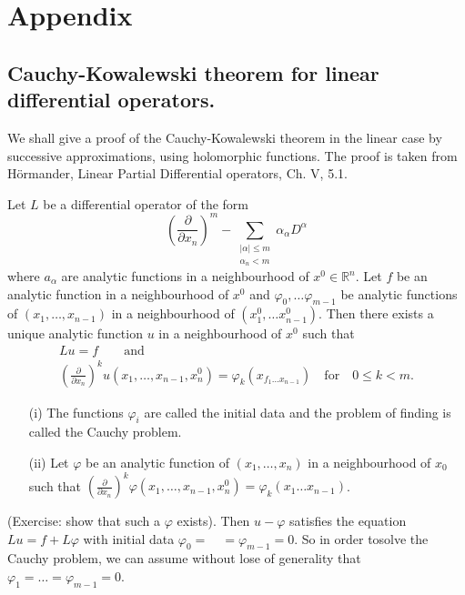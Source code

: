 \appendix
\chapter*{Appendix}


\setcounter{pageoriginal}{0}
\section*{Cauchy-Kowalewski theorem for linear differential operators.}\pageoriginale

We shall give a proof of the Cauchy-Kowalewski theorem in the linear case by successive approximations, using holomorphic functions. The proof is taken from H\"ormander, Linear Partial Differential operators, Ch. V, 5.1.

\setcounter{theorem}{0}
\begin{theorem}\label{appendix-thm1}
Let $L$ be a differential operator of the form
$$
\left(\frac{\partial}{\partial x_{n}}\right)^{m}-\sum\limits_{\substack{|\alpha|\leq m\\ \alpha_{n}<m}}\alpha_{\alpha}D^{\alpha}
$$
where $a_{\alpha}$ are analytic functions in a neighbourhood of $x^{0}\in \mathbb{R}^{n}$. Let $f$ be an analytic function in a neighbourhood of $x^{0}$ and $\varphi_{0},\ldots\varphi_{m-1}$ be analytic functions of $(x_{1},\ldots,x_{n-1})$ in a neighbourhood of $(x^{0}_{1},\ldots x^{0}_{n-1})$. Then there exists a unique analytic function $u$ in a neighbourhood of $x^{0}$ such that
\begin{gather*}
Lu=f\qquad\text{and}\\[4pt]
\left(\frac{\partial}{\partial x_{n}}\right)^{k}u\left(x_{1},\ldots,x_{n-1},x^{0}_{n}\right)=\varphi_{k}(x_{f_{1}\ldots x_{n-1}})\quad\text{for}\quad 0\leq k<m.
\end{gather*}
\end{theorem}

\begin{remark*}
\begin{itemize}
\item[\rm(i)] The functions $\varphi_{i}$ are called the initial data and the problem of finding is called the Cauchy problem.

\item[\rm(ii)] Let $\varphi$ be an analytic function of $(x_{1},\ldots,x_{n})$ in a neighbourhood of $x_{0}$ such that $\left(\frac{\partial}{\partial x_{n}}\right)^{k}\varphi(x_{1},\ldots,x_{n-1},x^{0}_{n})=\varphi_{k}(x_{1}\ldots x_{n-1})$.
\end{itemize}
(Exercise: show that such a $\varphi$ exists). Then $u-\varphi$ satisfies the equation $Lu=f+L\varphi$ with initial data $\varphi_{0}=\quad=\varphi_{m-1}=0$. So in order to\pageoriginale solve the Cauchy problem, we can assume without lose of generality that $\varphi_{1}=\ldots=\varphi_{m-1}=0$.
\end{remark*}

